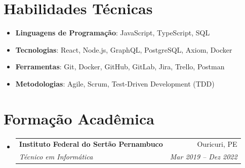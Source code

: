 \documentclass[letterpaper,10pt]{article}
\makeatletter
\newcommand{\resumeItem}[2]{
  \item\small{
    \textbf{#1}{: #2 \vspace{-2pt}}
  }
}
\newcommand{\resumeSubheading}[4]{
  \vspace{-1pt}\item
    \begin{tabular*}{0.97\textwidth}[t]{l@{\extracolsep{\fill}}r}
      \textbf{#1} & #2 \\
      \textit{\small #3} & \textit{\small #4} \\
    \end{tabular*}\vspace{-5pt}
}
\newcommand{\resumeSubItem}[2]{\resumeItem{#1}{#2}\vspace{-4pt}}
\newcommand{\resumeSubHeadingListStart}{\begin{itemize}[leftmargin=*]}
\newcommand{\resumeSubHeadingListEnd}{\end{itemize}}
\makeatother
\begin{document}
\section{Habilidades Técnicas}
  \resumeSubHeadingListStart
    \resumeItem{Linguagens de Programação}{JavaScript, TypeScript, SQL}
    \resumeItem{Tecnologias}{React, Node.js, GraphQL, PostgreSQL, Axiom, Docker}
    \resumeItem{Ferramentas}{Git, Docker, GitHub, GitLab, Jira, Trello, Postman}
    \resumeItem{Metodologias}{Agile, Scrum, Test-Driven Development (TDD)}
  \resumeSubHeadingListEnd

\section{Formação Acadêmica}
  \resumeSubHeadingListStart
    \resumeSubheading
      {Instituto Federal do Sertão Pernambuco}{Ouricuri, PE}
      {Técnico em Informática}{Mar 2019 -- Dez 2022}
  \resumeSubHeadingListEnd


%


\end{document}
